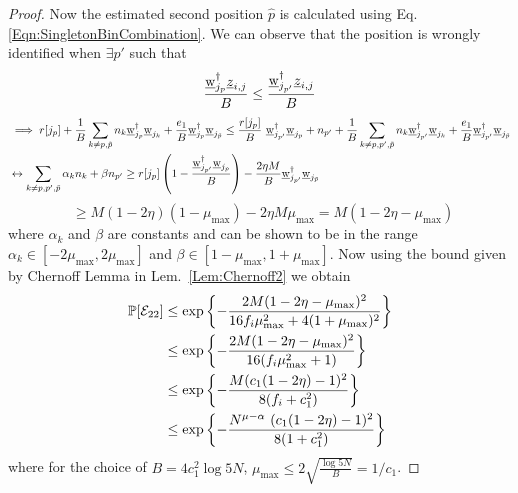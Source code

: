 \begin{proof}
	Now the estimated second position $\hat{p}$ is calculated using Eq. \eqref{Eqn:SingletonBinCombination}. We can observe that the position is wrongly identified when $\exists p'$ such that
	\[ \frac{\underline{\mathrm{w}}_{j_p}^{\dagger}\underline{z}_{i,j}}{B} \leq \frac{\underline{\mathrm{w}}_{j_{p'}}^{\dagger}\underline{z}_{i,j}}{B}\]
	\begin{align*}
		&\implies r[j_p] + \frac{1}{B}\sum_{k \neq p, \tilde{p}} n_k 	\underline{\mathrm{w}}_{j_p}^{\dagger}\underline{\mathrm{w}}_{j_k} + \frac{e_1}{B} \underline{\mathrm{w}}_{j_p}^{\dagger}\underline{\mathrm{w}}_{j_{\tilde{p}}}  \leq \frac{r[j_p]}{B} ~ \underline{\mathrm{w}}_{j_{p'}}^{\dagger}\underline{\mathrm{w}}_{j_p}+ n_{p'}+\frac{1}{B}\sum_{k \neq p,p',\tilde{p}}n_k\underline{\mathrm{w}}_{j_{p'}}^{\dagger} \underline{\mathrm{w}}_{j_k} + \frac{e_1}{B} \underline{\mathrm{w}}_{j_{p'}}^{\dagger}\underline{\mathrm{w}}_{j_{\tilde{p}}}\\
		&\leftrightarrow \sum_{k \neq p,p',\tilde{p}}\alpha_k n_k+ \beta n_{p'}  \geq  r[j_p]\left(1-\frac{\underline{\mathrm{w}}_{j_{p'}}^{\dagger}\underline{\mathrm{w}}_{j_p}}{B}\right) - \frac{2 \eta M}{B} \underline{\mathrm{w}}_{j_{p'}}^{\dagger}\underline{\mathrm{w}}_{j_{\tilde{p}}}
	\end{align*}
	\[~~\geq M(1-2\eta)(1-\mu_{\text{max}}) - 2 \eta M \mu_{\text{max}} = M(1 - 2\eta - \mu_{\text{max}})                         
	\]
	where $\alpha_k$ and $\beta$ are constants and can be shown to be in the range $\alpha_k\in[-2\mu_\text{max},2\mu_\text{max}]$ and $\beta\in[1-\mu_\text{max},1+\mu_\text{max}]$. Now using the bound given by Chernoff Lemma in Lem.~\ref{Lem:Chernoff2} we obtain
	\begin{align*}
		\mathbb{P}[\mathcal{E}_{22}]&\leq \exp\left\lbrace-\frac{2M(1 - 2\eta - \mu_{\text{max}})^2}{16f_i\mu^2_{\max}+4(1+\mu_{\max})^2}\right\rbrace\\
		&\leq\exp\left\lbrace-\frac{2M(1 - 2\eta - \mu_{\text{max}})^2}{16(f_i\mu^2_{\max}+1)}\right\rbrace\\
		&\leq\exp\left\lbrace-\frac{M(c_1(1 - 2\eta) - 1)^2}{8(f_i+c_1^2)}\right\rbrace\\
		&\leq\exp\left\lbrace-\frac{N^{\mu - \alpha} ~ (c_1(1 - 2\eta) - 1)^2}{8(1+ c_1^2)}\right\rbrace\\
	\end{align*}
	where for the choice of $B=4c_1^2\log 5N$, $\mu_{\max}\leq 2\sqrt{\frac{\log 5N}{B}} = 1/c_1$.
	
\end{proof}

\begin{lemma}
\end{lemma}

\begin{lemma}
\end{lemma}
